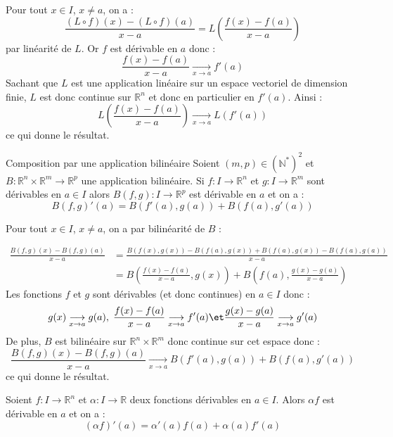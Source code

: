 \documentclass[french,11pt,twoside]{VcCours}
\begin{document}
\begin{Demonstration}{} Pour tout $x \in I$, $x \neq a$, on a :
$$ \dfrac{(L \circ f)(x) - (L \circ f)(a) }{x-a} = L \left( \frac{f(x)-f(a)}{x-a} \right)$$
par linéarité de $L$. Or $f$ est dérivable en $a$ donc :
$$ \frac{f(x)-f(a)}{x-a} \underset{x \rightarrow a}{\longrightarrow} f'(a)$$
Sachant que $L$ est une application linéaire sur un espace vectoriel de dimension finie, $L$ est donc continue sur $\mathbb{R}^n$ et donc en particulier en $f'(a)$. Ainsi :
$$ L \left( \frac{f(x)-f(a)}{x-a} \right) \underset{x \rightarrow a}{\longrightarrow} L(f'(a))$$
ce qui donne le résultat.
\end{Demonstration}


\begin{Proposition}{Composition par une application bilinéaire}
Soient $(m,p) \in (\mathbb{N}^*)^2$ et $B : \mathbb{R}^n \times \mathbb{R}^m \rightarrow \mathbb{R}^p$ une application bilinéaire. Si $f : I \rightarrow \mathbb{R}^n$ et $g : I \rightarrow \mathbb{R}^m$ sont dérivables en $a \in I$ alors $B(f,g):  I \rightarrow \mathbb{R}^p$ est dérivable en $a$ et on a :
$$ B(f,g)'(a)= B(f'(a),g(a))+B(f(a),g'(a))$$
\end{Proposition}

\begin{Demonstration}{}
Pour tout $x \in I$, $x \neq a$, on a par bilinéarité de $B$ :

\begin{align*}
\frac{B(f,g)(x)-B(f,g)(a)}{x-a} & =\frac{B(f(x),g(x))-B(f(a),g(x))+B(f(a),g(x))-B(f(a),g(a))}{x-a} \\
& = B \left( \frac{f(x)-f(a)}{x-a},g(x) \right) + B \left( f(a), \frac{g(x)-g(a)}{x-a} \right) 
\end{align*}
Les fonctions $f$ et $g$ sont dérivables (et donc continues) en $a \in I$ donc :
$$ g(x) \underset{x \rightarrow a}{\longrightarrow} g(a), \; \frac{f(x)-f(a)}{x-a}\underset{x \rightarrow a}{\longrightarrow} f'(a) \et \frac{g(x)-g(a)}{x-a} \underset{x \rightarrow a}{\longrightarrow} g'(a)$$
De plus, $B$ est bilinéaire sur $\mathbb{R}^n \times \mathbb{R}^m$ donc continue sur cet espace donc :
$$ \frac{B(f,g)(x)-B(f,g)(a)}{x-a}   \underset{x \rightarrow a}{\longrightarrow}  B(f'(a),g(a))+ B(f(a),g'(a))$$
ce qui donne le résultat.
\end{Demonstration}

\begin{Corollaire}{} Soient $f : I \rightarrow \mathbb{R}^n$ et $\alpha : I \rightarrow \mathbb{R}$ deux fonctions dérivables en $a \in I$. Alors $\alpha f $ est dérivable en $a$ et on a :
$$ (\alpha f)'(a) = \alpha'(a) f(a) + \alpha(a) f'(a)$$
\end{Corollaire}
\end{document}
